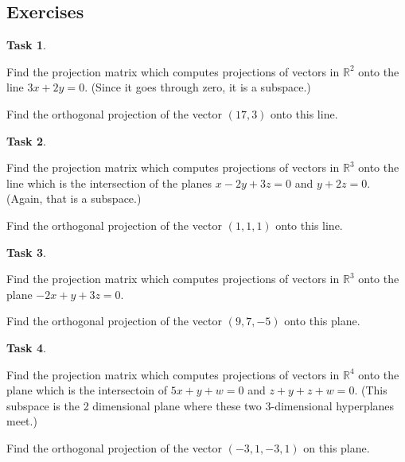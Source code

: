 \documentclass[10pt,]{book}
\theoremstyle{plain}
\theoremstyle{definition}
\numberwithin{equation}{section}
\newtheorem{task}{Task}[chapter]
\begin{document}
\subsection[Exercises]{Exercises}\label{subsection-101}
\begin{task}
\label{task-127}

            Find the projection matrix which computes projections of vectors in
            \(\mathbb{R}^2\) onto the line \(3x+2y=0\).
            (Since it goes through zero, it is a subspace.)
\par

            Find the orthogonal projection of the vector
            \(\left( 17,3 \right)\) onto this line.
\end{task}
\begin{task}
\label{task-128}

            Find the projection matrix which computes projections of vectors in
            \(\mathbb{R}^3\) onto the line which is the intersection of the
            planes \(x-2y+3z = 0\) and \(y+2z=0\). (Again, that is a subspace.)
\par

            Find the orthogonal projection of the vector \(\left(1,1,1\right)\)
            onto this line.
\end{task}
\begin{task}
\label{task-129}

            Find the projection matrix which computes projections of vectors in
            \(\mathbb{R}^3\) onto the plane \(-2x + y +3z = 0\).
\par

            Find the orthogonal projection of the vector \(\left( 9,7,-5\right)\)
            onto this plane.
\end{task}
\begin{task}
\label{task-130}

            Find the projection matrix which computes projections of vectors in
            \(\mathbb{R}^4\) onto the plane which is the intersectoin of
            \(5x+y +w=0\) and \(z+y+z+w=0\). (This subspace is the 2
            dimensional plane where these two 3-dimensional hyperplanes meet.)
\par

            Find the orthogonal projection of the vector
            \(\left(-3,1,-3,1\right)\) on this plane.
\end{task}
\clearpage
\typeout{************************************************}
\typeout{************************************************}
\end{document}
